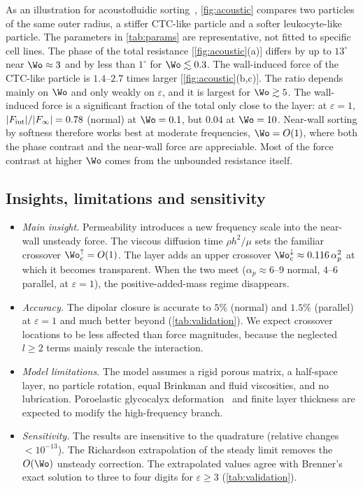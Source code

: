 As an illustration for acoustofluidic sorting~\cite{wu2019acoustofluidic,hossein2023review}, \cref{fig:acoustic}
compares two particles of the same outer radius, a stiffer CTC-like particle and a softer leukocyte-like particle. The
parameters in \cref{tab:params} are representative, not fitted to specific cell lines. The phase of the total resistance
[\cref{fig:acoustic}(a)] differs by up to $13^\circ$ near $\Wo\approx3$ and by less than $1^\circ$ for $\Wo\lesssim0.3$. The
wall-induced force of the CTC-like particle is $1.4$--$2.7$ times larger [\cref{fig:acoustic}(b,c)]. The ratio depends
mainly on $\Wo$ and only weakly on $\varepsilon$, and it is largest for $\Wo\gtrsim5$. The wall-induced force is a
significant fraction of the total only close to the layer: at $\varepsilon=1$, $|F_{\rm int}|/|F_\infty|=0.78$ (normal)
at $\Wo=0.1$, but $0.04$ at $\Wo=10$. Near-wall sorting by softness therefore works best at moderate frequencies,
$\Wo=O(1)$, where both the phase contrast and the near-wall force are appreciable. Most of the force contrast at
higher $\Wo$ comes from the unbounded resistance itself. 

\subsection{Insights, limitations and sensitivity}\label{sec:limitations}
\begin{itemize}
\item \emph{Main insight.} Permeability introduces a new frequency scale into the near-wall unsteady force. The
      viscous diffusion time $\rho h^2/\mu$ sets the familiar crossover $\Wo_c^{\uparrow}=O(1)$. The layer adds an
      upper crossover $\Wo_c^{\downarrow}\approx0.116\,\alpha_p^2$ at which it becomes transparent. When the two meet
      ($\alpha_p\approx6$--$9$ normal, $4$--$6$ parallel, at $\varepsilon=1$), the positive-added-mass regime
      disappears.
\item \emph{Accuracy.} The dipolar closure is accurate to $5\%$ (normal) and $1.5\%$ (parallel) at $\varepsilon=1$ and
      much better beyond (\cref{tab:validation}). We expect crossover locations to be less affected than force magnitudes, because the neglected $l\ge2$ terms mainly
rescale the interaction. 
\item \emph{Model limitations.} The model assumes a rigid porous matrix, a half-space layer, no particle rotation, equal
      Brinkman and fluid viscosities, and no lubrication. Poroelastic glycocalyx deformation~\cite{batalha2026elasto} and
      finite layer thickness are expected to modify the high-frequency branch.
\item \emph{Sensitivity.} The results are insensitive to the quadrature (relative changes $<10^{-13}$). The Richardson extrapolation of the steady limit removes the $O(\Wo)$ unsteady correction. The
      extrapolated values agree with Brenner's exact solution to three to four digits for $\varepsilon\ge3$
      (\cref{tab:validation}).
\end{itemize}
